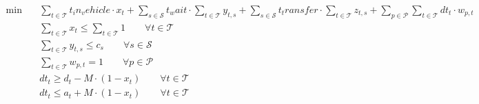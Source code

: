 \begin{align}
  \min\quad & \sum_{t \in \mathcal{T}} t_in_vehicle \cdot x_t + \sum_{s \in \mathcal{S}} t_wait \cdot \sum_{t \in \mathcal{T}} y_{t,s} + \sum_{s \in \mathcal{S}} t_transfer \cdot \sum_{t \in \mathcal{T}} z_{t,s} + \sum_{p \in \mathcal{P}} \sum_{t \in \mathcal{T}} dt_t \cdot w_{p,t} \tag{generalized\_travel\_time} \\
  & \sum_{t \in \mathcal{T}} x_t \le \sum_{t \in \mathcal{T}} 1 \qquad \forall t \in \mathcal{T} \tag{train\_dispatching} \\
  & \sum_{t \in \mathcal{T}} y_{t,s} \le c_s \qquad \forall s \in \mathcal{S} \tag{station\_capacity} \\
  & \sum_{t \in \mathcal{T}} w_{p,t} = 1 \qquad \forall p \in \mathcal{P} \tag{passenger\_reassignment} \\
  & dt_t \ge d_t - M \cdot (1 - x_t) \qquad \forall t \in \mathcal{T} \tag{train\_timing} \\
  & dt_t \le a_t + M \cdot (1 - x_t) \qquad \forall t \in \mathcal{T} \tag{train\_timing} \\
\end{align}